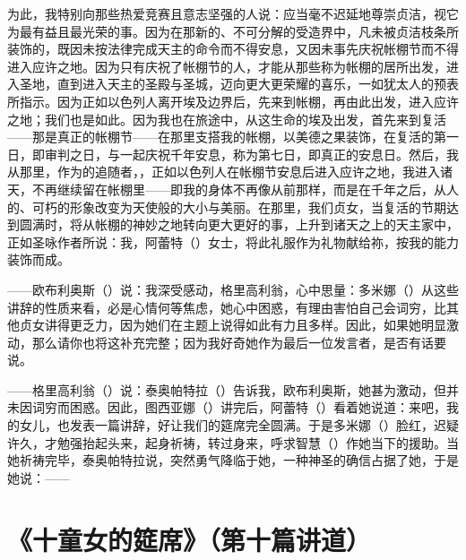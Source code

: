 为此，我特别向那些热爱竞赛且意志坚强的人说：应当毫不迟延地尊崇贞洁，视它为最有益且最光荣的事。因为在那新的、不可分解的受造界中，凡未被贞洁枝条所装饰的，既因未按法律完成天主的命令而不得安息，又因未事先庆祝帐棚节而不得进入应许之地。因为只有庆祝了帐棚节的人，才能从那些称为帐棚的居所出发，进入圣地，直到进入天主的圣殿与圣城，迈向更大更荣耀的喜乐，一如犹太人的预表所指示。因为正如以色列人离开埃及边界后，先来到帐棚，再由此出发，进入应许之地；我们也是如此。因为我也在旅途中，从这生命的埃及出发，首先来到复活——那是真正的帐棚节——在那里支搭我的帐棚，以美德之果装饰，在复活的第一日，即审判之日，与一起庆祝千年安息，称为第七日，即真正的安息日。然后，我从那里，作为的追随者，，正如以色列人在帐棚节安息后进入应许之地，我进入诸天，不再继续留在帐棚里——即我的身体不再像从前那样，而是在千年之后，从人的、可朽的形象改变为天使般的大小与美丽。在那里，我们贞女，当复活的节期达到圆满时，将从帐棚的神妙之地转向更大更好的事，上升到诸天之上的天主家中，正如圣咏作者所说：我，阿蕾特（）女士，将此礼服作为礼物献给祢，按我的能力装饰而成。\par

——欧布利奥斯（）说：我深受感动，格里高利翁，心中思量：多米娜（）从这些讲辞的性质来看，必是心情何等焦虑，她心中困惑，有理由害怕自己会词穷，比其他贞女讲得更乏力，因为她们在主题上说得如此有力且多样。因此，如果她明显激动，那么请你也将这补充完整；因为我好奇她作为最后一位发言者，是否有话要说。\par

——格里高利翁（）说：泰奥帕特拉（）告诉我，欧布利奥斯，她甚为激动，但并未因词穷而困惑。因此，图西亚娜（）讲完后，阿蕾特（）看着她说道：来吧，我的女儿，也发表一篇讲辞，好让我们的筵席完全圆满。于是多米娜（）脸红，迟疑许久，才勉强抬起头来，起身祈祷，转过身来，呼求智慧（）作她当下的援助。当她祈祷完毕，泰奥帕特拉说，突然勇气降临于她，一种神圣的确信占据了她，于是她说：——\par



\section{《十童女的筵席》（第十篇讲道）}

